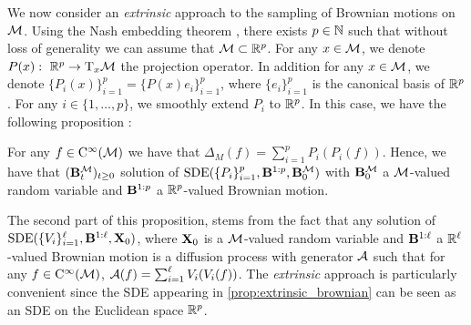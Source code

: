 We now consider an \emph{extrinsic} approach to the sampling of Brownian motions
on $\mathcal M$. Using the Nash embedding theorem \citep{gunther1991isometric}, there
exists $p \in \mathbb{N}$ such that without loss of generality we can assume that
$\mathcal M \subset \mathbb{R}^p$. For any $x \in \mathcal M$, we denote
$P(x): \ \mathbb{R}^p \to \mathrm{T}_x \mathcal M$ the projection operator. In addition for
any $x \in \mathcal M$, we denote $\{P_i(x)\}_{i=1}^p = \{P(x) e_i\}_{i=1}^p$, where
$\{e_i\}_{i=1}^p$ is the canonical basis of $\mathbb{R}^p$. For any
$i \in \{1, \dots, p\}$, we smoothly extend $P_i$ to $\mathbb{R}^p$. In this case, we
have the following proposition \cite[Theorem 3.1.4]{hsu2002stochastic}:

\begin{proposition}
  \label{prop:extrinsic_brownian}
  For any $f \in \mathrm{C}^{\infty}(\mathcal M)$ we have that
  $\Delta_M(f) = \sum_{i=1}^p P_i(P_i(f))$. Hence, we have that
  $(\mathbf{B}_t^\mathcal M)_{t \geq 0}$ solution of
  $\mathrm{SDE}(\{P_i\}_{i=1}^{p}, \mathbf{B}^{1:p}, \mathbf{B}_0^\mathcal M)$ with $\mathbf{B}_0^\mathcal M$ a $\mathcal M$-valued
  random variable and $\mathbf{B}^{1:p}$ a $\mathbb{R}^p$-valued Brownian motion.
\end{proposition}

The second part of this proposition, stems from the fact that any solution of
$\mathrm{SDE}(\{V_i\}_{i=1}^{\ell}, \mathbf{B}^{1:\ell}, \mathbf{X}_0)$, where $\mathbf{X}_0$ is a
$\mathcal M$-valued random variable and $\mathbf{B}^{1:\ell}$ a $\mathbb{R}^\ell$-valued Brownian
motion is a diffusion process with generator $\mathcal{A}$ such that for any
$f \in \mathrm{C}^\infty(\mathcal M)$, $\mathcal{A}(f) = \sum_{i=1}^\ell V_i(V_i(f))$. The
\emph{extrinsic} approach is particularly convenient since the SDE appearing in 
\cref{prop:extrinsic_brownian} can be seen as an SDE on the Euclidean space
$\mathbb{R}^p$. 

